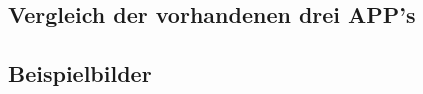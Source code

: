 \subsection{\textbf{Vergleich der vorhandenen drei \acs{APP}'s}}
\begin{landscape}

\newpage






\end{landscape}


\subsection{\textbf{Beispielbilder}}

